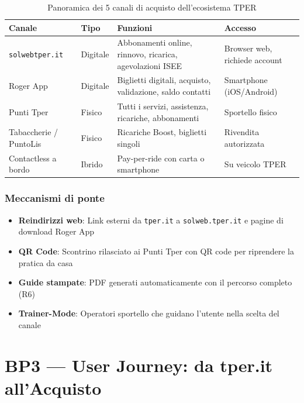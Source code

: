 ﻿\documentclass[11pt,a4paper]{article}
\begin{document}
\begin{table}[H]
\centering
\small
\renewcommand{\arraystretch}{1.3}
\begin{tabular}{|p{2.5cm}|p{3.5cm}|p{3.5cm}|p{3.5cm}|}
\hline
\textbf{Canale} & \textbf{Tipo} & \textbf{Funzioni} & \textbf{Accesso} \\
\hline
\texttt{solweb}\discretionary{-}{-}{.}\texttt{tper.it} & Digitale & Abbonamenti online, rinnovo, ricarica, agevolazioni ISEE & Browser web, richiede account \\
\hline
Roger App & Digitale & Biglietti digitali, acquisto, validazione, saldo contatti & Smartphone (iOS/Android) \\
\hline
Punti Tper & Fisico & Tutti i servizi, assistenza, ricariche, abbonamenti & Sportello fisico \\
\hline
Tabaccherie / PuntoLis & Fisico & Ricariche Boost, biglietti singoli & Rivendita autorizzata \\
\hline
Contactless a bordo & Ibrido & Pay-per-ride con carta o smartphone & Su veicolo TPER \\
\hline
\end{tabular}
\caption{Panoramica dei 5 canali di acquisto dell'ecosistema TPER}
\label{tab:canali}
\end{table}

\subsubsection*{Meccanismi di ponte}
\begin{itemize}
    \item \textbf{Reindirizzi web}: Link esterni da \texttt{tper.it} a \texttt{solweb.tper.it} e pagine di download Roger App
    \item \textbf{QR Code}: Scontrino rilasciato ai Punti Tper con QR code per riprendere la pratica da casa
    \item \textbf{Guide stampate}: PDF generati automaticamente con il percorso completo (R6)
    \item \textbf{Trainer-Mode}: Operatori sportello che guidano l'utente nella scelta del canale
\end{itemize}

\vspace{0.3cm}

\section{BP3 --- User Journey: da tper.it all'Acquisto}
\end{document}
